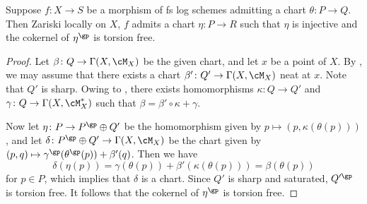 \documentclass[10pt]{amsart}
\begin{document}
\begin{lem}
\label{loc.21}
Suppose $f\colon X\to S$ be a morphism of fs log schemes admitting a chart $\theta\colon P\to Q$.
Then Zariski locally on $X$, $f$ admits a chart $\eta\colon P\to R$ such that $\eta$ is injective and the cokernel of $\eta^\gp$ is torsion free.
\end{lem}
\begin{proof}
Let $\beta\colon Q\to \Gamma(X,\cM_X)$ be the given chart, and let $x$ be a point of $X$.
By \cite[Proposition II.2.3.7]{Ogu}, we may assume that there exists a chart $\beta'\colon Q'\to \Gamma(X,\cM_X)$ neat at $x$.
Note that $Q'$ is sharp.
Owing to \cite[Proposition II.2.3.9]{Ogu}, there exists homomorphisms $\kappa \colon Q\to Q'$ and $\gamma \colon Q \to \Gamma(X,\cM_X^*)$ such that $\beta=\beta'\circ \kappa+\gamma$.

Now let $\eta\colon P\to P^\gp \oplus Q'$ be the homomorphism given by $p\mapsto (p,\kappa(\theta(p)))$, and let $\delta\colon P^\gp \oplus Q'\to \Gamma(X,\cM_X)$ be the chart given by $(p,q)\mapsto \gamma^\gp( \theta^\gp(p)) + \beta'(q)$.
Then we have
\[
\delta(\eta(p))
=
\gamma(\theta(p)) + \beta'(\kappa(\theta(p)))
=
\beta(\theta(p))
\]
for $p\in P$, which implies that $\delta$ is a chart.
Since $Q'$ is sharp and saturated, $Q'^\gp$ is torsion free.
It follows that the cokernel of $\eta^\gp$ is torsion free.
\end{proof}
\end{document}
